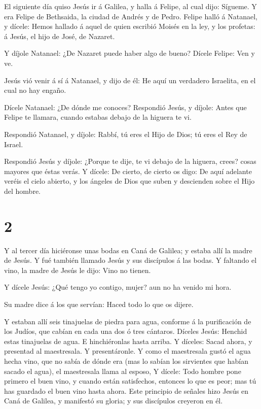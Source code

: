  El siguiente día quiso Jesús ir á Galilea, y halla á
Felipe, al cual dijo: Sígueme.  Y era Felipe de Bethsaida,
la ciudad de Andrés y de Pedro.  Felipe halló á Natanael, y
dícele: Hemos hallado á aquel de quien escribió Moisés en la ley, y los
profetas: á Jesús, el hijo de José, de Nazaret.

 Y díjole Natanael: ¿De Nazaret puede haber algo de bueno?
Dícele Felipe: Ven y ve.

 Jesús vió venir á sí á Natanael, y dijo de él: He aquí un
verdadero Israelita, en el cual no hay engaño.

 Dícele Natanael: ¿De dónde me conoces? Respondió Jesús, y
díjole: Antes que Felipe te llamara, cuando estabas debajo de la higuera
te vi.

 Respondió Natanael, y díjole: Rabbí, tú eres el Hijo de
Dios; tú eres el Rey de Israel.

 Respondió Jesús y díjole: ¿Porque te dije, te vi debajo de
la higuera, crees? cosas mayores que éstas verás.  Y
dícele: De cierto, de cierto os digo: De aquí adelante veréis el cielo
abierto, y los ángeles de Dios que suben y descienden sobre el Hijo del
hombre.

\hypertarget{section-1}{%
\section{2}\label{section-1}}

 Y al tercer día hiciéronse unas bodas en Caná de Galilea; y
estaba allí la madre de Jesús.  Y fué también llamado Jesús
y sus discípulos á las bodas.  Y faltando el vino, la madre
de Jesús le dijo: Vino no tienen.

 Y dícele Jesús: ¿Qué tengo yo contigo, mujer? aun no ha
venido mi hora.

 Su madre dice á los que servían: Haced todo lo que os
dijere.

 Y estaban allí seis tinajuelas de piedra para agua,
conforme á la purificación de los Judíos, que cabían en cada una dos ó
tres cántaros.  Díceles Jesús: Henchid estas tinajuelas de
agua. E hinchiéronlas hasta arriba.  Y díceles: Sacad ahora,
y presentad al maestresala. Y presentáronle.  Y como el
maestresala gustó el agua hecha vino, que no sabía de dónde era (mas lo
sabían los sirvientes que habían sacado el agua), el maestresala llama
al esposo,  Y dícele: Todo hombre pone primero el buen
vino, y cuando están satisfechos, entonces lo que es peor; mas tú has
guardado el buen vino hasta ahora.  Este principio de
señales hizo Jesús en Caná de Galilea, y manifestó su gloria; y sus
discípulos creyeron en él.

